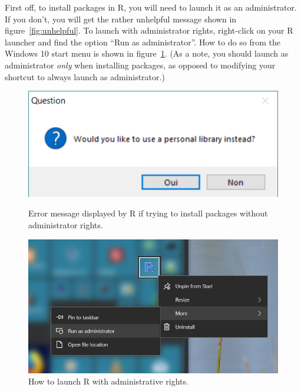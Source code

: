 \documentclass{report}
\begin{document}
	First off, to install packages in R, you will need to launch it as an administrator. If you don't, you will get the rather unhelpful message shown in figure~\ref{fig:unhelpful}. To launch with administrator rights, right-click on your R launcher and find the option ``Run as administrator''. How to do so from the Windows 10 start menu is shown in figure~\ref{fig:admin}. (As a note, you should launch as administrator \emph{only} when installing packages, as opposed to modifying your shortcut to always launch as administrator.)
	\begin{figure}[h]
		\centering
		\begin{minipage}{.475\textwidth}
			\centering
			\includegraphics[width=.8\linewidth]{unhelpful.png}
			\caption{Error message displayed by R if trying to install packages without administrator rights.}
			\label{fig:unhelpful}
		\end{minipage}
		\hfill
		\begin{minipage}{.475\textwidth}
			\centering
			\includegraphics[width=.8\linewidth]{admin.png}
			\caption{How to launch R with administrative rights.}
			\label{fig:admin}
		\end{minipage}
	\end{figure}
\end{document}

